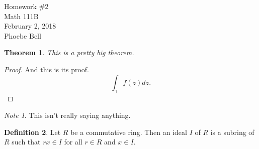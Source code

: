 \documentclass[letterpaper,11pt]{article}
\newcommand{\mytitle}{Homework \#2}
\newcommand{\myauthor}{Phoebe Bell}
\newcommand{\mydate}{February 2, 2018}
\newcommand{\myclass}{Math 111B}
\newtheorem{thm}{Theorem}
\theoremstyle{definition}
\newtheorem{defn}[thm]{Definition}
\theoremstyle{remark}
\newtheorem*{note}{Note}
\begin{document}
\begin{center}
	{\Large \mytitle}\\
        \vspace*{0.6em}
        \myclass \\
	\vspace*{0.6em}
	\mydate \\
	\vspace*{0.6em}
	\myauthor \\
        \vspace*{1.2em}
\end{center}

\begin{thm}
This is a pretty big theorem.
\end{thm}
\begin{proof}
And this is its proof.
\[\int_\gamma f(z)dz.\]
\end{proof}

\begin{note}
This isn't really saying anything.
\end{note}

\begin{defn}
Let $R$ be a commutative ring. Then an ideal $I$ of $R$ is a subring of $R$ such
that $rx\in I$ for all $r\in R$ and $x\in I$.
\end{defn}
\end{document}
